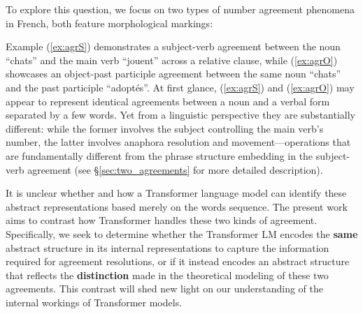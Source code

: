 To explore this question, we focus on two types of number agreement phenomena in French, both feature morphological markings:
Example (\ref{ex:agrS}) demonstrates a subject-verb agreement between the noun ``chats'' and the main verb ``jouent'' across a relative clause, while (\ref{ex:agrO}) showcases an object-past participle agreement between the same noun ``chats'' and the past participle ``adoptés''. At first glance,
(\ref{ex:agrS}) and (\ref{ex:agrO}) may appear to represent
identical agreements between a noun and a verbal form separated by a
few words. Yet from a linguistic perspective they are substantially different: while the former involves the subject controlling the main verb's number, the latter involves anaphora resolution and movement---operations that are fundamentally different from the phrase structure embedding in the subject-verb agreement (see \S\ref{sec:two_agreements} for more detailed description). 

It is unclear whether
and how a Transformer language model can identify these abstract
representations based merely on the words sequence. The present work aims to contrast how Transformer handles these two kinds of
agreement. Specifically, we seek to determine whether the Transformer LM encodes the \textbf{same}
abstract structure in its internal representations to capture the
information required for agreement resolutions, or if it instead encodes an abstract structure that reflects the
\textbf{distinction} made in the theoretical modeling of these two
agreements. This contrast will shed new light on our understanding
of the internal workings of Transformer models.


